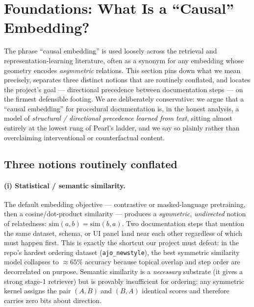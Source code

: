 \section{Foundations: What Is a ``Causal'' Embedding?}
\label{sec:foundations}

The phrase ``causal embedding'' is used loosely across the retrieval and
representation-learning literature, often as a synonym for any embedding whose
geometry encodes \emph{asymmetric} relations. This section pins down what we
mean precisely, separates three distinct notions that are routinely conflated,
and locates the project's goal --- directional precedence between documentation
steps --- on the firmest defensible footing. We are deliberately conservative:
we argue that a ``causal embedding'' for procedural documentation is, in the
honest analysis, a model of \emph{structural / directional precedence learned
from text}, sitting almost entirely at the lowest rung of Pearl's ladder, and we
say so plainly rather than overclaiming interventional or counterfactual
content.

\subsection{Three notions routinely conflated}
\label{sec:three-notions}

\paragraph{(i) Statistical / semantic similarity.}
The default embedding objective --- contrastive or masked-language pretraining,
then a cosine/dot-product similarity --- produces a \emph{symmetric},
\emph{undirected} notion of relatedness: $\mathrm{sim}(a,b)=\mathrm{sim}(b,a)$.
Two documentation steps that mention the same dataset, schema, or UI panel land
near each other regardless of which must happen first. This is exactly the
shortcut our project must defeat: in the repo's hardest ordering dataset
(\texttt{ajo\_newstyle}), the best symmetric similarity model collapses to
$\approx 65\%$ accuracy because topical overlap and step order are decorrelated
on purpose. Semantic similarity is a \emph{necessary} substrate (it gives a
strong stage-1 retriever) but is provably insufficient for ordering: any
symmetric kernel assigns the pair $(A,B)$ and $(B,A)$ identical scores and
therefore carries zero bits about direction.

